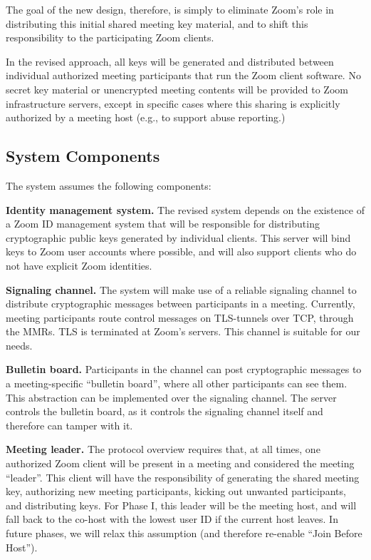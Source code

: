 The goal of the new design, therefore, is simply to eliminate Zoom's role in distributing this initial shared meeting key material, and to shift this responsibility to the participating Zoom clients.

In the revised approach, all keys will be generated and distributed between individual authorized meeting participants that run the Zoom client software. No secret key material or unencrypted meeting contents will be provided to Zoom infrastructure servers, except in specific cases where this sharing is explicitly authorized by a meeting host (e.g., to support abuse reporting.)

\subsection{System Components}

The system assumes the following components:
\begin{description}
\item {\bf Identity management system.} The revised system depends on the existence of a Zoom ID management system that will be responsible for distributing cryptographic public keys generated by individual clients. This server will bind keys to Zoom user accounts where possible, and will also support clients who do not have explicit Zoom identities.

\item {\bf Signaling channel.} The system will make use of a reliable signaling channel to distribute cryptographic messages between participants in a meeting. Currently, meeting participants route control messages on TLS-tunnels over TCP, through the MMRs. TLS is terminated at Zoom's servers. This channel is suitable for our needs.

\item {\bf Bulletin board.} Participants in the channel can post cryptographic messages to a meeting-specific ``bulletin board'', where all other participants can see them. This abstraction can be implemented over the signaling channel. The server controls the bulletin board, as it controls the signaling channel itself and therefore can tamper with it.

\item {\bf Meeting leader.} The protocol overview requires that, at all times, one authorized Zoom client will be present in a meeting and considered the meeting ``leader''. This client will have the responsibility of generating the shared meeting key, authorizing new meeting participants, kicking out unwanted participants, and distributing keys. For Phase I, this leader will be the meeting host, and will fall back to the co-host with the lowest user ID if the current host leaves. In future phases, we will relax this assumption (and therefore re-enable ``Join Before Host'').

\end{description}

